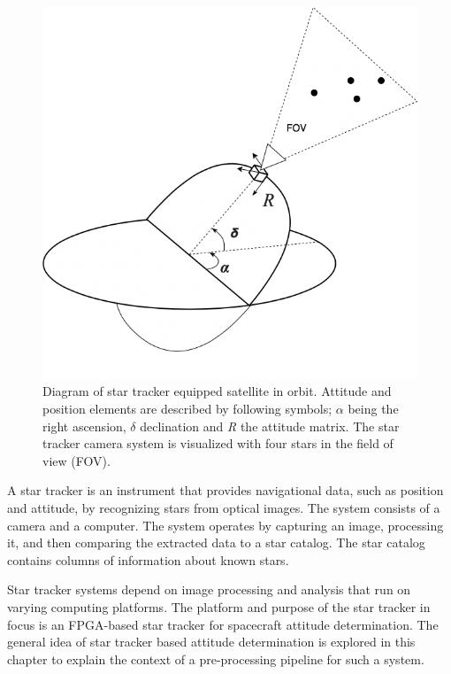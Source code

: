 \documentclass[12pt]{report}
\begin{document}
\begin{figure}[h]
    \centering
    \includegraphics[scale=0.4]{figures/st_ref.png}
    \caption{Diagram of star tracker equipped satellite in orbit. Attitude and position elements are described by following symbols; \textbf{$\alpha$} being the right ascension, \textbf{$\delta$} declination and \textit{R} the attitude matrix. The star tracker camera system is visualized with four stars in the field of view (FOV).}
    \label{fig:orbit}
\end{figure}

A star tracker is an instrument that provides navigational data, such as position and attitude, by recognizing stars from optical images. The system consists of a camera and a computer. The system operates by capturing an image, processing it, and then comparing the extracted data to a star catalog. The star catalog contains columns of information about known stars. \citep{SatDesgin}
\par
Star tracker systems depend on image processing and analysis that run on varying computing platforms. The platform and purpose of the star tracker in focus is an FPGA-based star tracker for spacecraft attitude determination. The general idea of star tracker based attitude determination is explored in this chapter to explain the context of a pre-processing pipeline for such a system.
\end{document}
